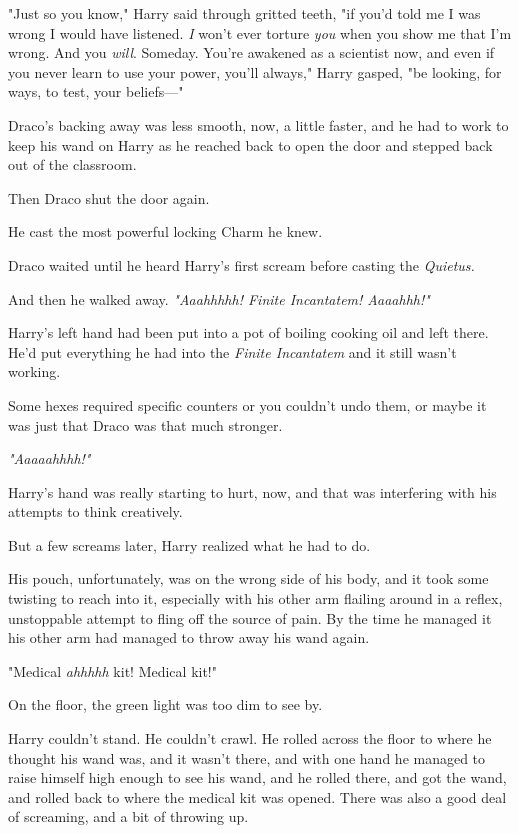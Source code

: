 "Just so you know," Harry said through gritted teeth, "if you'd told me I was
wrong I would have listened. \emph{I} won't ever torture \emph{you} when you
show me that I'm wrong. And you \emph{will}. Someday. You're awakened as a
scientist now, and even if you never learn to use your power, you'll always,"
Harry gasped, "be looking, for ways, to test, your beliefs\mbox{---}"

Draco's backing away was less smooth, now, a little faster, and he had to work
to keep his wand on Harry as he reached back to open the door and stepped back
out of the classroom.

Then Draco shut the door again.

He cast the most powerful locking Charm he knew.

Draco waited until he heard Harry's first scream before casting the
\emph{Quietus.}

And then he walked away.
\sbreak
\emph{"Aaahhhhh! Finite Incantatem! Aaaahhh!"}

Harry's left hand had been put into a pot of boiling cooking oil and left
there. He'd put everything he had into the \emph{Finite Incantatem} and it
still wasn't working.

Some hexes required specific counters or you couldn't undo them, or maybe it
was just that Draco was that much stronger.

\emph{"Aaaaahhhh!"}

Harry's hand was really starting to hurt, now, and that was interfering with
his attempts to think creatively.

But a few screams later, Harry realized what he had to do.

His pouch, unfortunately, was on the wrong side of his body, and it took some
twisting to reach into it, especially with his other arm flailing around in a
reflex, unstoppable attempt to fling off the source of pain. By the time he
managed it his other arm had managed to throw away his wand again.

"Medical \emph{ahhhhh} kit! Medical kit!"

On the floor, the green light was too dim to see by.

Harry couldn't stand. He couldn't crawl. He rolled across the floor to where he
thought his wand was, and it wasn't there, and with one hand he managed to
raise himself high enough to see his wand, and he rolled there, and got the
wand, and rolled back to where the medical kit was opened. There was also a
good deal of screaming, and a bit of throwing up.

